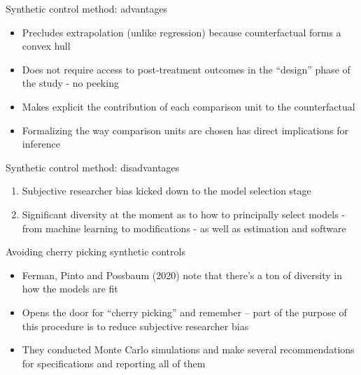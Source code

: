 \documentclass{beamer}
\begin{document}
\begin{frame}{Synthetic control method: advantages}
	
	\begin{itemize}
	\item Precludes extrapolation (unlike regression) because counterfactual forms a convex hull
	\item Does not require access to post-treatment outcomes in the ``design'' phase of the study - no peeking
	\item Makes explicit the contribution of each comparison unit to the counterfactual 
	\item Formalizing the way comparison units are chosen has direct implications for inference
	\end{itemize}
\end{frame}


\begin{frame}{Synthetic control method: disadvantages}

\begin{enumerate}
\item Subjective researcher bias kicked down to the model selection stage
\item Significant diversity at the moment as to how to principally select models - from machine learning to modifications - as well as estimation and software
\end{enumerate}



\end{frame}

\begin{frame}{Avoiding cherry picking synthetic controls}

\begin{itemize}
\item Ferman, Pinto and Possbaum (2020) note that there's a ton of diversity in how the models are fit
\item Opens the door for ``cherry picking'' and remember -- part of the purpose of this procedure is to reduce subjective researcher bias
\item They conducted Monte Carlo simulations and make several recommendations for specifications and reporting all of them

\end{itemize}

\end{frame}
\end{document}
